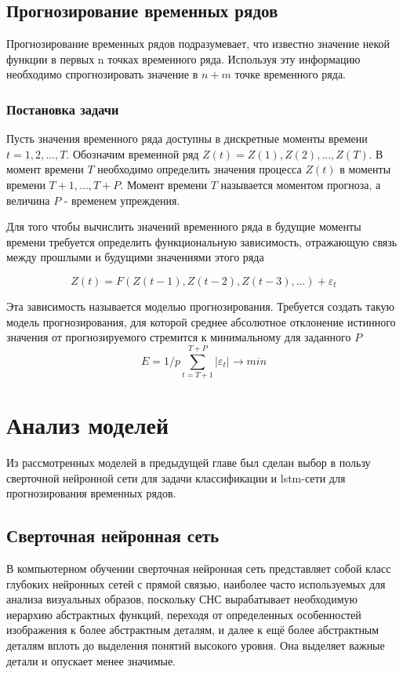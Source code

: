 \subsection{Прогнозирование временных рядов}

Прогнозирование временных рядов подразумевает, что известно значение некой функции в первых n точках временного ряда. Используя эту информацию необходимо спрогнозировать значение в $n+m$ точке временного ряда. 

\subsubsection{Постановка задачи}
Пусть значения временного ряда доступны в дискретные моменты времени $t = 1,2,...,T$. Обозначим временной ряд $Z(t) = Z(1), Z(2),...,Z(T)$. В момент времени $T$ необходимо определить значения процесса $Z(t)$ в моменты времени $T+1,...,T+P$. Момент времени $T$ называется моментом прогноза, а величина $P$ - временем упреждения.

Для того чтобы вычислить значений временного ряда в будущие моменты времени требуется определить функциональную зависимость, отражающую связь между прошлыми и будущими значениями этого ряда

$$ Z(t)=F(Z(t-1), Z(t-2), Z(t-3),...)+\varepsilon_t $$ 


Эта зависимость называется моделью прогнозирования. Требуется создать такую модель прогнозирования, для которой среднее абсолютное отклонение истинного значения от прогнозируемого стремится к минимальному для заданного $P$
$$  E=1/p \sum_{t=T+1}^{T+P} \vert \varepsilon_t \vert \rightarrow min $$
    




\section{Анализ моделей}


Из рассмотренных моделей в предыдущей главе был сделан выбор в пользу сверточной нейронной сети для задачи классификации и lstm-сети для прогнозирования временных рядов.
\subsection{Сверточная  нейронная  сеть}

В компьютерном обучении сверточная нейронная сеть представляет собой класс глубоких нейронных сетей с прямой связью, наиболее часто используемых для анализа визуальных образов, поскольку СНС вырабатывает необходимую иерархию абстрактных функций, переходя от определенных особенностей изображения к более абстрактным деталям, и далее к ещё более абстрактным деталям вплоть до выделения понятий высокого уровня. Она выделяет важные детали и опускает менее значимые.

